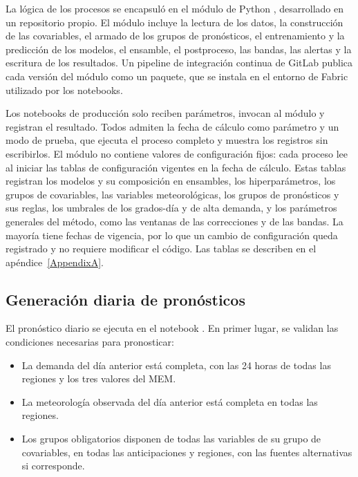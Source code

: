 La lógica de los procesos se encapsuló en el módulo de Python , desarrollado en un repositorio propio. El módulo incluye la lectura de los datos, la construcción de las covariables, el armado de los grupos de pronósticos, el entrenamiento y la predicción de los modelos, el ensamble, el postproceso, las bandas, las alertas y la escritura de los resultados. Un pipeline de integración continua de GitLab publica cada versión del módulo como un paquete, que se instala en el entorno de Fabric utilizado por los notebooks.

Los notebooks de producción solo reciben parámetros, invocan al módulo y registran el resultado. Todos admiten la fecha de cálculo como parámetro y un modo de prueba, que ejecuta el proceso completo y muestra los registros sin escribirlos. El módulo no contiene valores de configuración fijos: cada proceso lee al iniciar las tablas de configuración vigentes en la fecha de cálculo. Estas tablas registran los modelos y su composición en ensambles, los hiperparámetros, los grupos de covariables, las variables meteorológicas, los grupos de pronósticos y sus reglas, los umbrales de los grados-día y de alta demanda, y los parámetros generales del método, como las ventanas de las correcciones y de las bandas. La mayoría tiene fechas de vigencia, por lo que un cambio de configuración queda registrado y no requiere modificar el código. Las tablas se describen en el apéndice~\ref{AppendixA}.

\subsection{Generación diaria de pronósticos}
\label{subsec:pronostico_diario}

El pronóstico diario se ejecuta en el notebook . En primer lugar, se validan las condiciones necesarias para pronosticar:

\begin{itemize}
	\item La demanda del día anterior está completa, con las 24 horas de todas las regiones y los tres valores del MEM.
	\item La meteorología observada del día anterior está completa en todas las regiones.
	\item Los grupos obligatorios disponen de todas las variables de su grupo de covariables, en todas las anticipaciones y regiones, con las fuentes alternativas si corresponde.
\end{itemize}

